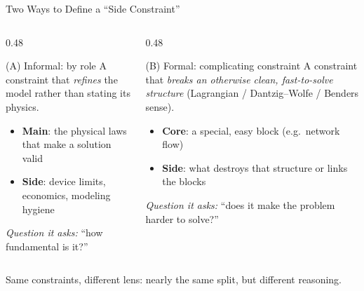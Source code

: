 \documentclass[aspectratio=169]{beamer}
\begin{document}
\begin{frame}{Two Ways to Define a ``Side Constraint''}
\begin{columns}[t]
\begin{column}{0.48\textwidth}
\begin{block}{(A) Informal: by role}
\footnotesize
A constraint that \emph{refines} the model rather than stating its physics.
\begin{itemize}
    \item \textbf{Main}: the physical laws that make a solution valid
    \item \textbf{Side}: device limits, economics, modeling hygiene
\end{itemize}
\textit{Question it asks:} ``how fundamental is it?''
\end{block}
\end{column}
\begin{column}{0.48\textwidth}
\begin{block}{(B) Formal: complicating constraint}
\footnotesize
A constraint that \emph{breaks an otherwise clean, fast-to-solve structure}
(Lagrangian / Dantzig--Wolfe / Benders sense).
\begin{itemize}
    \item \textbf{Core}: a special, easy block (e.g.\ network flow)
    \item \textbf{Side}: what destroys that structure or links the blocks
\end{itemize}
\textit{Question it asks:} ``does it make the problem harder to solve?''
\end{block}
\end{column}
\end{columns}
\vspace{0.2cm}
\footnotesize
\centering
Same constraints, different lens: nearly the same split, but different reasoning.
\end{frame}
\end{document}
